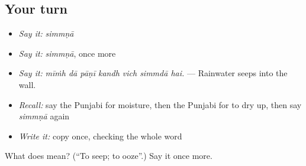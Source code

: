\subsection*{Your turn}
\begin{itemize}
\raggedright
  \item \emph{Say it:} \emph{simmṇā}
  \item \emph{Say it:} \emph{simmṇā}, once more
  \item \emph{Say it:} \emph{mīṁh dā pāṇī kandh vich simmdā hai.} — Rainwater seeps into the wall.
  \item \emph{Recall:} say the Punjabi for moisture, then the Punjabi for to dry up, then say \emph{simmṇā} again
  \item \emph{Write it:} copy \textbf{} once, checking the whole word
\end{itemize}

\begin{tcolorbox}[breakable,colback=teal!4,colframe=teal!35!black,title={Before you move on}]
What does  mean? (\textquotedblleft{}To seep; to ooze\textquotedblright{}.) Say it once more.
\end{tcolorbox}
